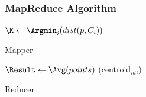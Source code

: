 \begin{frame}
\frametitle{MapReduce Algorithm}

\begin{algorithm}[H]
$\K \leftarrow \Argmin_i(dist(p,C_i))$ \;
\;
\caption{Mapper}
\end{algorithm}

\begin{algorithm}[H]
$\Result \leftarrow \Avg(points)$\;
\Emit(centroid$_{id}$,\Result)\;
\caption{Reducer}
\end{algorithm}
\end{frame}

